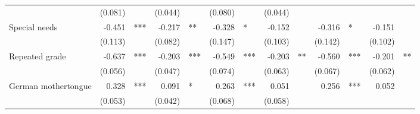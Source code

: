 \documentclass{article}
\begin{document}
\begin{table}[!h]
\begin{tabular}{lllllllllllll}
  \multicolumn{1}{l}{} &
  \multicolumn{1}{r}{(0.081)} &
  \multicolumn{1}{l}{} &
  \multicolumn{1}{r}{(0.044)} &
  \multicolumn{1}{l}{} &
  \multicolumn{1}{r}{(0.080)} &
  \multicolumn{1}{l}{} &
  \multicolumn{1}{r}{(0.044)} &
  \multicolumn{1}{l}{} \\
\multicolumn{1}{l}{Special needs} &
  \multicolumn{1}{r}{-0.451} &
  \multicolumn{1}{l}{***} &
  \multicolumn{1}{r}{-0.217} &
  \multicolumn{1}{l}{**} &
  \multicolumn{1}{r}{-0.328} &
  \multicolumn{1}{l}{*} &
  \multicolumn{1}{r}{-0.152} &
  \multicolumn{1}{l}{} &
  \multicolumn{1}{r}{-0.316} &
  \multicolumn{1}{l}{*} &
  \multicolumn{1}{r}{-0.151} &
  \multicolumn{1}{l}{} \\
\multicolumn{1}{l}{} &
  \multicolumn{1}{r}{(0.113)} &
  \multicolumn{1}{l}{} &
  \multicolumn{1}{r}{(0.082)} &
  \multicolumn{1}{l}{} &
  \multicolumn{1}{r}{(0.147)} &
  \multicolumn{1}{l}{} &
  \multicolumn{1}{r}{(0.103)} &
  \multicolumn{1}{l}{} &
  \multicolumn{1}{r}{(0.142)} &
  \multicolumn{1}{l}{} &
  \multicolumn{1}{r}{(0.102)} &
  \multicolumn{1}{l}{} \\
\multicolumn{1}{l}{Repeated grade} &
  \multicolumn{1}{r}{-0.637} &
  \multicolumn{1}{l}{***} &
  \multicolumn{1}{r}{-0.203} &
  \multicolumn{1}{l}{***} &
  \multicolumn{1}{r}{-0.549} &
  \multicolumn{1}{l}{***} &
  \multicolumn{1}{r}{-0.203} &
  \multicolumn{1}{l}{**} &
  \multicolumn{1}{r}{-0.560} &
  \multicolumn{1}{l}{***} &
  \multicolumn{1}{r}{-0.201} &
  \multicolumn{1}{l}{**} \\
\multicolumn{1}{l}{} &
  \multicolumn{1}{r}{(0.056)} &
  \multicolumn{1}{l}{} &
  \multicolumn{1}{r}{(0.047)} &
  \multicolumn{1}{l}{} &
  \multicolumn{1}{r}{(0.074)} &
  \multicolumn{1}{l}{} &
  \multicolumn{1}{r}{(0.063)} &
  \multicolumn{1}{l}{} &
  \multicolumn{1}{r}{(0.067)} &
  \multicolumn{1}{l}{} &
  \multicolumn{1}{r}{(0.062)} &
  \multicolumn{1}{l}{} \\
\multicolumn{1}{l}{German mothertongue} &
  \multicolumn{1}{r}{0.328} &
  \multicolumn{1}{l}{***} &
  \multicolumn{1}{r}{0.091} &
  \multicolumn{1}{l}{*} &
  \multicolumn{1}{r}{0.263} &
  \multicolumn{1}{l}{***} &
  \multicolumn{1}{r}{0.051} &
  \multicolumn{1}{l}{} &
  \multicolumn{1}{r}{0.256} &
  \multicolumn{1}{l}{***} &
  \multicolumn{1}{r}{0.052} &
  \multicolumn{1}{l}{} \\
\multicolumn{1}{l}{} &
  \multicolumn{1}{r}{(0.053)} &
  \multicolumn{1}{l}{} &
  \multicolumn{1}{r}{(0.042)} &
  \multicolumn{1}{l}{} &
  \multicolumn{1}{r}{(0.068)} &
  \multicolumn{1}{l}{} &
  \multicolumn{1}{r}{(0.058)} &

\end{tabular}
\end{table}
\end{document}
